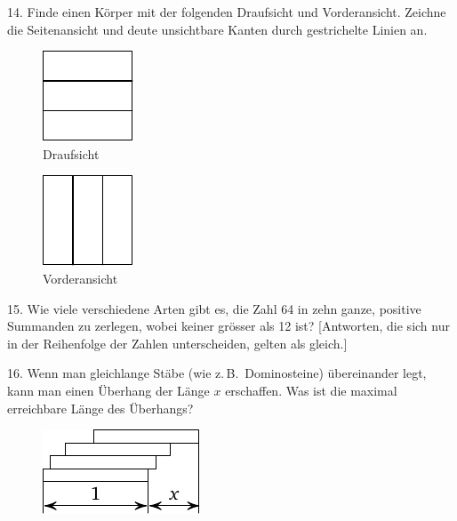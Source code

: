 \begin{problem}{14.}
	Finde einen Körper mit der folgenden Draufsicht und Vorderansicht. Zeichne die Seitenansicht und deute unsichtbare Kanten durch gestrichelte Linien an.
	\begin{figure}
		\footnotesize
		\null\hfill
		\parbox{0.2\linewidth}{\centering\includegraphics{resources/taskbook-99}\\Draufsicht}
		\hfill
		\parbox{0.2\linewidth}{\centering\includegraphics{resources/taskbook-98}\\Vorderansicht}
		\hfill\null
	\end{figure}
\end{problem}

\begin{problem}{15.}
	Wie viele verschiedene Arten gibt es, die Zahl 64 in zehn ganze, positive Summanden zu zerlegen, wobei keiner grösser als 12 ist?
	[Antworten, die sich nur in der Reihenfolge der Zahlen unterscheiden, gelten als gleich.]
\end{problem}

\begin{problem}{16.}
	Wenn man gleichlange Stäbe (wie z.\,B.\ Dominosteine) übereinander legt, kann man einen Überhang der Länge $x$ erschaffen. Was ist die maximal er\-reich\-ba\-re Länge des Überhangs?
	\begin{figure}
		\includegraphics{resources/taskbook-97}
	\end{figure}
\end{problem}


